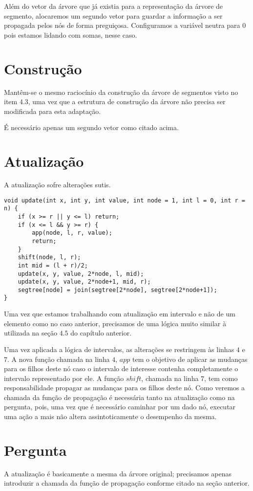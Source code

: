 Além do vetor da árvore que já existia para a representação da árvore de segmento, alocaremos um segundo vetor para guardar a informação a ser propagada pelos nós de forma preguiçosa. Configuramos a variável neutra para $0$ pois estamos lidando com somas, nesse caso.

\section{Construção}
Mantêm-se o mesmo raciocínio da construção da árvore de segmentos visto no item 4.3, uma vez que a estrutura de construção da árvore não precisa ser modificada para esta adaptação.

É necessário apenas um segundo vetor como citado acima.

\section{Atualização}
A atualização sofre alterações sutis.

\begin{lstlisting}
void update(int x, int y, int value, int node = 1, int l = 0, int r = n) {
    if (x >= r || y <= l) return;
    if (x <= l && y >= r) {
        app(node, l, r, value);
        return;
    }
    shift(node, l, r);
    int mid = (l + r)/2;
    update(x, y, value, 2*node, l, mid);
    update(x, y, value, 2*node+1, mid, r);
    segtree[node] = join(segtree[2*node], segtree[2*node+1]);
}
\end{lstlisting}
Uma vez que estamos trabalhando com atualização em intervalo e não de um elemento como no caso anterior, precisamos de uma lógica muito similar à utilizada na seção $4.5$ do capítulo anterior.

Uma vez aplicada a lógica de intervalos, as alterações se restringem às linhas $4$ e $7$. A nova função chamada na linha $4$, $app$ tem o objetivo de aplicar as mudanças para os filhos deste nó caso o intervalo de interesse contenha completamente o intervalo representado por ele. A função $shift$, chamada na linha $7$, tem como responsabilidade propagar as mudanças para os filhos deste nó. Como veremos a chamada da função de propagação é necessária tanto na atualização como na pergunta, pois, uma vez que é necessário caminhar por um dado nó, executar uma ação a mais não altera assintoticamente o desempenho da mesma.

\section{Pergunta}
A atualização é basicamente a mesma da árvore original; precisamos apenas introduzir a chamada da função de propagação conforme citado na seção anterior.

